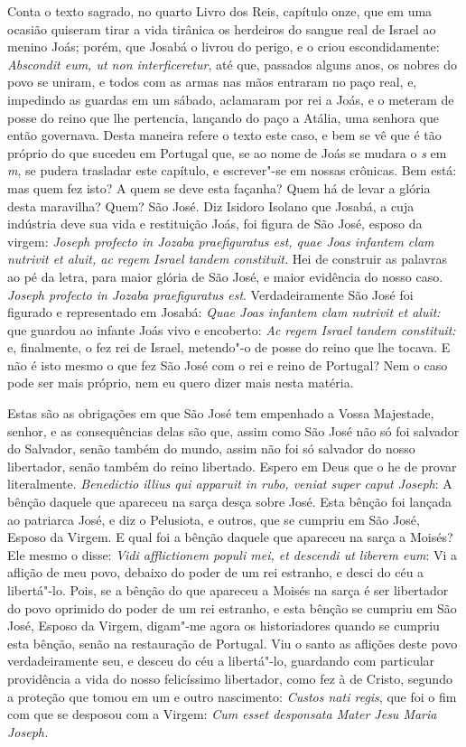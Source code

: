 Conta o texto sagrado, no quarto Livro dos Reis, capítulo onze, que em
uma ocasião quiseram tirar a vida tirânica os herdeiros do sangue real
de Israel ao menino Joás; porém, que Josabá o livrou do perigo, e o
criou escondidamente:
\emph{Abscondit eum, ut non interficeretur}, até que, passados
alguns anos, os nobres do povo se uniram, e todos com as armas nas mãos
entraram no paço real, e, impedindo as guardas em um sábado, aclamaram
por rei a Joás, e o meteram de posse do reino que lhe pertencia,
lançando do paço a Atália, uma senhora que então governava. Desta
maneira refere o texto este caso, e bem se vê que é tão próprio do que
sucedeu em Portugal que, se ao nome de Joás se mudara o \emph{s} em \emph{m},
se pudera trasladar este capítulo, e escrever"-se em nossas crônicas. Bem
está: mas quem fez isto? A quem se deve esta façanha? Quem há de levar a
glória desta maravilha? Quem? São José. Diz Isidoro Isolano que Josabá,
a cuja indústria deve sua vida e restituição Joás, foi figura de São
José, esposo da virgem: \emph{Joseph profecto in Jozaba praefiguratus
est, quae Joas infantem clam nutrivit et aluit, ac regem Israel tandem
constituit.} Hei de construir as palavras ao pé da letra, para maior
glória de São José, e maior evidência do nosso caso. \emph{Joseph
profecto in Jozaba praefiguratus est}. Verdadeiramente São José foi
figurado e representado em Josabá: \emph{Quae Joas infantem clam
nutrivit et aluit:} que guardou ao infante Joás vivo e encoberto:
\emph{Ac regem Israel tandem constituit:} e, finalmente, o fez rei de
Israel, metendo"-o de posse do reino que lhe tocava. E não é isto mesmo
o que fez São José com o rei e reino de Portugal? Nem o caso pode ser
mais próprio, nem eu quero dizer mais nesta matéria.

Estas são as obrigações em que São José tem empenhado a Vossa Majestade,
senhor, e as consequências delas são que, assim como São José não só foi
salvador do Salvador, senão também do mundo, assim não foi só salvador
do nosso libertador, senão também do reino libertado. Espero em Deus que
o he de provar literalmente. \emph{Benedictio illius qui apparuit in
rubo, veniat super caput Joseph}: A bênção daquele que
apareceu na sarça desça sobre José. Esta bênção foi lançada ao
patriarca José, e diz o Pelusiota, e outros, que se cumpriu em São José,
Esposo da Virgem. E qual foi a bênção daquele que apareceu na sarça a
Moisés? Ele mesmo o disse: \emph{Vidi afflictionem populi mei, et
descendi ut liberem eum}: Vi a aflição de meu povo, debaixo
do poder de um rei estranho, e desci do céu a libertá"-lo. Pois, se a
bênção do que apareceu a Moisés na sarça é ser libertador do povo
oprimido do poder de um rei estranho, e esta bênção se cumpriu em São
José, Esposo da Virgem, digam"-me agora os historiadores quando se
cumpriu esta bênção, senão na restauração de Portugal. Viu o santo as
aflições deste povo verdadeiramente seu, e desceu do céu a libertá"-lo,
guardando com particular providência a vida do nosso felicíssimo
libertador, como fez à de Cristo, segundo a proteção que tomou em um e
outro nascimento: \emph{Custos nati regis}, que foi o fim com que se
desposou com a Virgem: \emph{Cum esset desponsata Mater Jesu Maria
Joseph.}

